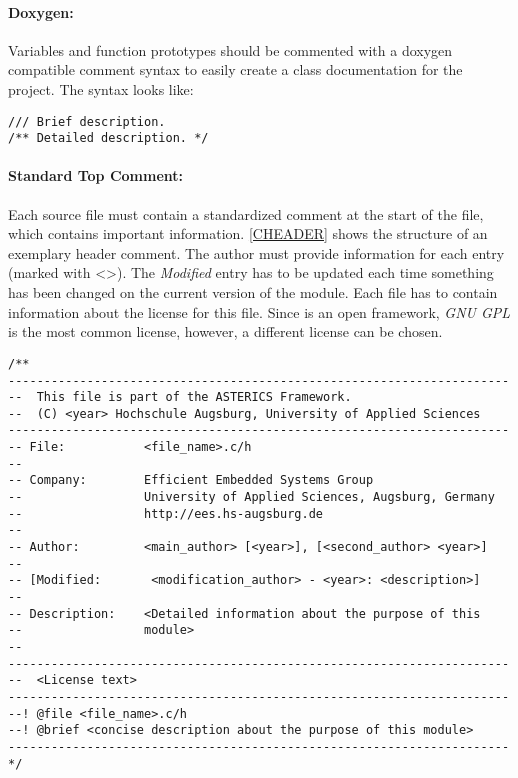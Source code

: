 \paragraph{Doxygen:}
Variables and function prototypes should be commented with a doxygen compatible comment syntax to easily create a class documentation for the project. The syntax looks like:
\begin{verbatim}
/// Brief description.
/** Detailed description. */
\end{verbatim} 

\paragraph{Standard Top Comment:}
Each source file must contain a standardized comment at the start of the file, which contains important information. \ref{CHEADER} shows the structure of an exemplary header comment. The author must provide information for each entry (marked with \textless\textgreater). The \textit{Modified} entry has to be updated each time something has been changed on the current version of the module. Each file has to contain information about the license for this file. Since \asterics is an open framework, \textit{GNU GPL} is the most common license, however, a different license can be chosen.

\begin{lstlisting}[style=CStyle, label=CHEADER, caption=\asterics C source file header]
/**
----------------------------------------------------------------------
--  This file is part of the ASTERICS Framework. 
--  (C) <year> Hochschule Augsburg, University of Applied Sciences
----------------------------------------------------------------------
-- File:           <file_name>.c/h
--
-- Company:        Efficient Embedded Systems Group 
--                 University of Applied Sciences, Augsburg, Germany
--                 http://ees.hs-augsburg.de
--
-- Author:         <main_author> [<year>], [<second_author> <year>]
--
-- [Modified:       <modification_author> - <year>: <description>]
--
-- Description:    <Detailed information about the purpose of this 
--                 module>
--                 
----------------------------------------------------------------------
--  <License text>
----------------------------------------------------------------------
--! @file <file_name>.c/h
--! @brief <concise description about the purpose of this module>
----------------------------------------------------------------------
*/
\end{lstlisting}


